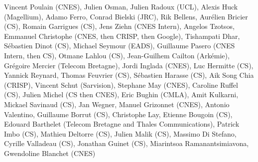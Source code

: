 Vincent Poulain (CNES), Julien Osman, Julien Radoux (UCL), Alexis Huck (Magellium), Adamo Ferro, Conrad Bielski (JRC), Rik Bellens, Aur\'elien Bricier (CS), Romain Garrigues (CS), Jens Ziehn (CNES Intern), Angelos Tzotsos, Emmanuel Christophe (CNES, then CRISP, then Google), Tishampati Dhar, S\'ebastien Dinot (CS), Michael Seymour (EADS), Guillaume Pasero (CNES Intern, then CS), Otmane Lahlou (CS), Jean-Guilhem Cailton (Ark\'emie), Gr\'egoire Mercier (Telecom Bretagne), Jordi Inglada (CNES), Luc Hermitte (CS), Yannick Reynard, Thomas Feuvrier (CS), S\'ebastien Harasse (CS), Aik Song Chia (CRISP), Vincent Schut (Sarvision), Stephane May (CNES), Caroline Ruffel (CS), Julien Michel (CS then CNES), Eric Bughin (CMLA), Amit Kulkarni, Mickael Savinaud (CS), Jan Wegner, Manuel Grizonnet (CNES), Antonio Valentino, Guillaume Borrut (CS), Christophe Lay, Etienne Bougoin (CS), Edouard Barthelet (Telecom Bretagne and Thales Communications), Patrick Imbo (CS), Mathieu Deltorre (CS), Julien Malik (CS), Massimo Di Stefano, Cyrille Valladeau (CS), Jonathan Guinet (CS), Miarintsoa Ramanantsimiavona, Gwendoline Blanchet (CNES)